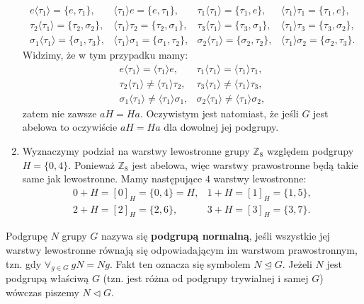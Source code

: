 \begin{przyk}
\begin{enumerate}[\rm(1)]
$$\begin{array}{llll}
e\langle\tau_1\rangle=\{e,\tau_1\}, & \langle\tau_1\rangle e=\{e,\tau_1\}, & \tau_1\langle\tau_1\rangle=\{\tau_1,e\}, & \langle\tau_1\rangle\tau_1=\{\tau_1,e\},\\
\tau_2\langle\tau_1\rangle=\{\tau_2,\sigma_2\}, & \langle\tau_1\rangle\tau_2=\{\tau_2,\sigma_1\}, & \tau_3\langle\tau_1\rangle=\{\tau_3,\sigma_1\}, & \langle\tau_1\rangle\tau_3=\{\tau_3,\sigma_2\},\\
\sigma_1\langle\tau_1\rangle=\{\sigma_1,\tau_3\}, & \langle\tau_1\rangle\sigma_1=\{\sigma_1,\tau_2\}, & \sigma_2\langle\tau_1\rangle=\{\sigma_2,\tau_2\}, & \langle\tau_1\rangle\sigma_2=\{\sigma_2,\tau_3\}.
\end{array}$$
Widzimy, że w tym przypadku mamy:
$$\begin{array}{llll}
e\langle\tau_1\rangle=\langle\tau_1\rangle e, & \tau_1\langle\tau_1\rangle=\langle\tau_1\rangle\tau_1,\\
\tau_2\langle\tau_1\rangle\neq\langle\tau_1\rangle\tau_2, & \tau_3\langle\tau_1\rangle\neq\langle\tau_1\rangle\tau_3,\\
\sigma_1\langle\tau_1\rangle\neq\langle\tau_1\rangle\sigma_1, & \sigma_2\langle\tau_1\rangle\neq\langle\tau_1\rangle\sigma_2,
\end{array}$$
zatem nie zawsze $aH=Ha$. Oczywistym jest natomiast, że jeśli $G$ jest abelowa to oczywiście $aH=Ha$ dla dowolnej jej podgrupy.
\item
Wyznaczymy podział na warstwy lewostronne grupy $\mathbb{Z}_8$ względem podgrupy $H=\{0,4\}$. Ponieważ $\mathbb{Z}_8$ jest abelowa, więc warstwy prawostronne będą takie same jak lewostronne. Mamy następujące $4$ warstwy lewostronne:
$$\begin{array}{ll}
0+H=[0]_H=\{0,4\}=H, & 1+H=[1]_H=\{1,5\},\\
2+H=[2]_H=\{2,6\}, & 3+H=[3]_H=\{3,7\}.
\end{array}$$
\end{enumerate}
\end{przyk}

\begin{df}
Podgrupę $N$ grupy $G$ nazywa się \textbf{podgrupą normalną}, jeśli wszystkie jej warstwy lewostronne równają się odpowiadającym im warstwom prawostronnym, tzn. gdy $\forall_{g\in G}\ gN=Ng$. Fakt ten oznacza się symbolem $N\unlhd G$. Jeżeli $N$ jest podgrupą właściwą $G$ (tzn. jest różna od podgrupy trywialnej i samej $G$) wówczas piszemy $N\lhd G$.
\end{df}

